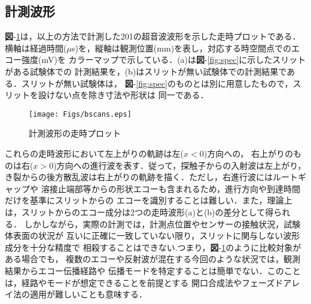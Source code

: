 \subsection{計測波形}
{\bf 図}-\ref{fig:bscans}は，以上の方法で計測した201の超音波波形を示した走時プロットである．
横軸は経過時間($\mu$s)を，縦軸は観測位置(mm)を表し，対応する時空間点でのエコー強度(mV)を
カラーマップで示している．(a)は{\bf 図}-\ref{fig:spec}に示したスリットがある試験体での
計測結果を，(b)はスリットが無い試験体での計測結果である．スリットが無い試験体は，
{\bf 図}-\ref{fig:spec}のものとは別に用意したもので，スリットを設けない点を除き寸法や形状は
同一である．
\begin{figure}[bht]
\centering
	\texttt{[image: Figs/bscans.eps]}
	\caption{計測波形の走時プロット}
	\label{fig:bscans}
\end{figure}
これらの走時波形において左上がりの軌跡は左($x<0$)方向への，
右上がりのものは右($x>0$)方向への進行波を表す．従って，探触子からの入射波は左上がり，
き裂からの後方散乱波は右上がりの軌跡を描く．ただし，右進行波にはルートギャップや
溶接止端部等からの形状エコーも含まれるため，進行方向や到達時間だけを基準にスリットからの
エコーを識別することは難しい．また，理論上は，スリットからのエコー成分は2つの走時波形(a)と(b)の差分として得られる．
しかしながら，実際の計測では，計測点位置やセンサーの接触状況，試験体表面の状況が
互いに正確に一致していない限り，スリットに関与しない波形成分を十分な精度で
相殺することはできない.つまり，{\bf 図}-\ref{fig:bscans}のように比較対象がある場合でも，
複数のエコーや反射波が混在する今回のような状況では，観測結果からエコー伝播経路や
伝播モードを特定することは簡単でない．このことは，経路やモードが想定できることを前提とする
開口合成法やフェーズドアレイ法の適用が難しいことも意味する．


